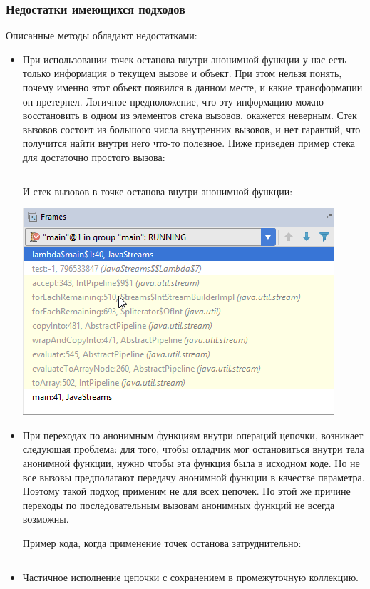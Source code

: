 \subsubsection{Недостатки имеющихся подходов}
Описанные методы обладают недостатками:
\begin{itemize}
	\item При использовании точек останова внутри анонимной функции у нас есть только информация о текущем вызове и объект. При этом нельзя понять, почему именно этот объект появился в данном месте, и какие трансформации он претерпел. Логичное предположение, что эту информацию можно восстановить в одном из элементов стека вызовов, окажется неверным. Стек вызовов состоит из большого числа внутренних вызовов, и нет гарантий, что получится найти внутри него что-то полезное. Ниже приведен пример стека для достаточно простого вызова:
	\inputminted{java}{chapter1/code/SimplestStreamExample.java}
	
	И стек вызовов в точке останова внутри анонимной функции:
	
	\includegraphics[scale=1.]{chapter1/img/stack.png}
	
	\item При переходах по анонимным функциям внутри операций цепочки, возникает следующая проблема: для того, чтобы отладчик мог остановиться внутри тела анонимной функции, нужно чтобы эта функция была в исходном коде. Но не все вызовы предполагают передачу анонимной функции в качестве параметра. Поэтому такой подход применим не для всех цепочек. По этой же причине переходы по последовательным вызовам анонимных функций не всегда возможны.
	
	Пример кода, когда применение точек останова затруднительно: \inputminted{java}{chapter1/code/HardToUseBreakpoint.java}
	
	\item Частичное исполнение цепочки с сохранением в промежуточную коллекцию.
	

\end{itemize}
